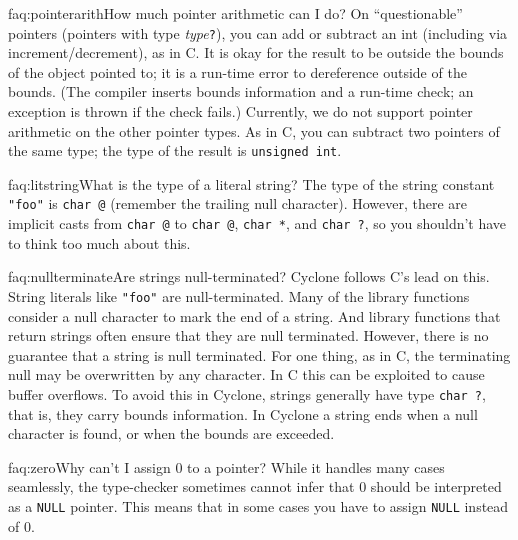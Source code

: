 \begin{faqa}{faq:pointerarith}{How much pointer arithmetic can I do?}
On ``questionable'' pointers (pointers with type
\textit{type}\texttt{?}), you can add or subtract an int (including
via increment/decrement), as in C\@.  It is okay for the result to be
outside the bounds of the object pointed to; it is a run-time error to
dereference outside of the bounds.  (The compiler inserts bounds
information and a run-time check; an exception is thrown if the check
fails.)  Currently, we do not support pointer arithmetic on the other
pointer types.  As in C, you can subtract two pointers of the same
type; the type of the result is \texttt{unsigned int}.
\end{faqa}

\begin{faqa}{faq:litstring}{What is the type of a literal string?}
The type of the string constant \texttt{"foo"} is \texttt{char @\rb} (remember the trailing null character).  However, there are implicit
casts from \texttt{char @\rb} to \texttt{char @\rb},
\texttt{char *\rb}, and \texttt{char ?}, so you shouldn't have to
think too much about this.
\end{faqa}

\begin{faqa}{faq:nullterminate}{Are strings null-terminated?}
Cyclone follows C's lead on this.  String literals like \texttt{"foo"}
are null-terminated.  Many of the library functions consider a null
character to mark the end of a string.  And library functions that
return strings often ensure that they are null terminated.  However,
there is no guarantee that a string is null terminated.  For one
thing, as in C, the terminating null may be overwritten by any
character.  In C this can be exploited to cause buffer overflows.  To
avoid this in Cyclone, strings generally have type \texttt{char ?},
that is, they carry bounds information.  In Cyclone a string ends when
a null character is found, or when the bounds are exceeded.
\end{faqa}

\begin{faqa}{faq:zero}{Why can't I assign 0 to a pointer?}
While it handles many cases seamlessly, the type-checker sometimes cannot
infer that 0 should be interpreted as a \texttt{NULL} pointer.  This means
that in some cases you have to assign \texttt{NULL} instead of 0.
\end{faqa}


